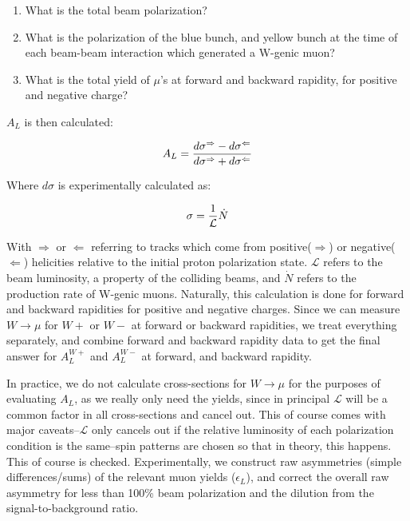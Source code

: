 \begin{enumerate}
  \item What is the total beam polarization?
  \item What is the polarization of the blue bunch, and yellow bunch at the
    time of each beam-beam interaction which generated a W-genic muon?
  \item What is the total yield of $\mu$'s at forward and backward rapidity,
    for positive and negative charge?
\end{enumerate}

$A_L$ is then calculated:

\begin{equation}
  A_L = {
    {d\sigma^{\Rightarrow} - d\sigma^{\Leftarrow}}
    \over
    {d\sigma^{\Rightarrow} + d\sigma^{\Leftarrow}}
  }
\end{equation}

Where $d\sigma$ is experimentally calculated as:

\begin{equation}
  \sigma = {1\over{\mathcal{L}}}{\dot{N}}
\end{equation}

With $\Rightarrow$ or $\Leftarrow$ referring to tracks which come from
positive($\Rightarrow$) or negative($\Leftarrow$) helicities relative to the
initial proton polarization state. $\mathcal{L}$ refers to the beam luminosity,
a property of the colliding beams, and $\dot{N}$ refers to the production rate
of W-genic muons. Naturally, this calculation is done for forward and backward
rapidities for positive and negative charges. Since we can measure
$W\rightarrow\mu$ for $W+$ or $W-$ at forward or backward rapidities, we treat
everything separately, and combine forward and backward rapidity data to get the
final answer for $A_L^{W+}$ and $A_L^{W-}$ at forward, and backward rapidity.

In practice, we do not calculate cross-sections for $W\rightarrow\mu$ for the
purposes of evaluating $A_L$, as we really only need the yields, since in
principal $\mathcal{L}$ will be a common factor in all cross-sections and cancel
out. This of course comes with major caveats--$\mathcal{L}$ only cancels out if
the relative luminosity of each polarization condition is the same--spin
patterns are chosen so that in theory, this happens. This of course is checked.
Experimentally, we construct raw asymmetries (simple differences/sums) of the
relevant muon yields ($\epsilon_{L}$), and correct the overall raw asymmetry for
less than 100\% beam polarization and the dilution from the signal-to-background
ratio.

